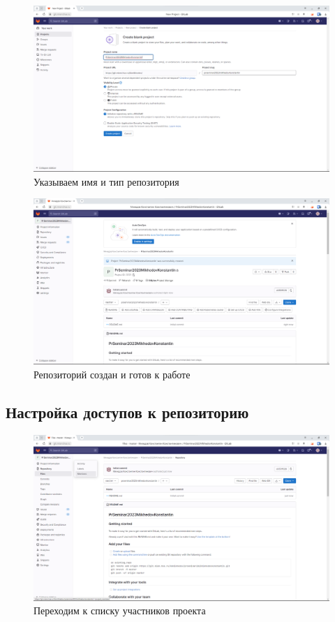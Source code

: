 \documentclass[a4paper]{article}
\begin{document}
  \begin{figure}[H]
    \centering
    \includegraphics[width=\textwidth]{1_ (58)}
    \caption{Указываем имя и тип репозитория}
  \end{figure}

  \begin{figure}[H]
    \centering
    \includegraphics[width=\textwidth]{1_ (57)}
    \caption{Репозиторий создан и готов к работе}
  \end{figure}

  \subsection{Настройка доступов к репозиторию}

  \begin{figure}[H]
    \centering
    \includegraphics[width=\textwidth]{1_ (55)}
    \caption{Переходим к списку участников проекта}
  \end{figure}
\end{document}
